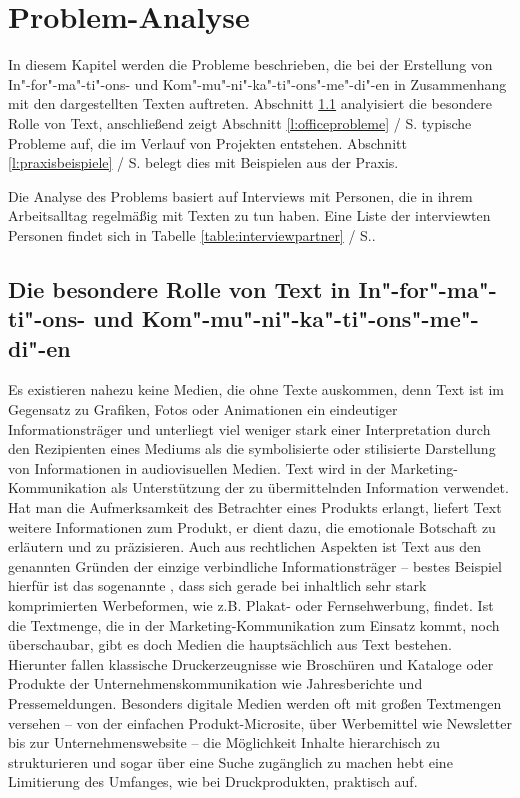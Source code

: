 \section{Problem-Analyse}\label{l:problemanalyse}

In diesem Kapitel werden die Probleme beschrieben, die bei der Erstellung von In"-for"-ma"-ti"-ons- und Kom"-mu"-ni"-ka"-ti"-ons"-me"-di"-en in Zusammenhang mit den dargestellten Texten auftreten. Abschnitt \ref{l:besondererolle} analyisiert die besondere Rolle von Text, anschließend zeigt Abschnitt \ref{l:officeprobleme} / S.\pageref{l:officeprobleme} typische Probleme auf, die im Verlauf von Projekten entstehen. Abschnitt \ref{l:praxisbeispiele} / S.\pageref{l:praxisbeispiele} belegt dies mit Beispielen aus der Praxis. 

\bigskip

Die Analyse des Problems basiert auf Interviews mit Personen, die in ihrem Arbeitsalltag regelmäßig mit Texten zu tun haben. Eine Liste der interviewten Personen findet sich in Tabelle \ref{table:interviewpartner} / S.\pageref{table:interviewpartner}.

\subsection{Die besondere Rolle von Text in In"-for"-ma"-ti"-ons- und Kom"-mu"-ni"-ka"-ti"-ons"-me"-di"-en}\label{l:besondererolle}

Es existieren nahezu keine Medien, die ohne Texte auskommen, denn Text ist im Gegensatz zu Grafiken, Fotos oder Animationen ein eindeutiger Informationsträger und unterliegt viel weniger stark einer Interpretation durch den Rezipienten eines Mediums als die symbolisierte oder stilisierte Darstellung von Informationen in audiovisuellen Medien. Text wird in der Marketing-Kommunikation als Unterstützung der zu übermittelnden Information verwendet. Hat man die Aufmerksamkeit des Betrachter eines Produkts erlangt, liefert Text weitere Informationen zum Produkt, er dient dazu, die emotionale Botschaft zu erläutern und zu präzisieren. Auch aus rechtlichen Aspekten ist Text aus den genannten Gründen der einzige verbindliche Informationsträger -- bestes Beispiel hierfür ist das sogenannte , dass sich gerade bei inhaltlich sehr stark komprimierten Werbeformen, wie z.B. Plakat- oder Fernsehwerbung, findet. Ist die Textmenge, die in der Marketing-Kommunikation zum Einsatz kommt, noch überschaubar, gibt es doch Medien die hauptsächlich aus Text bestehen. Hierunter fallen klassische Druckerzeugnisse wie Broschüren und Kataloge oder Produkte der Unternehmenskommunikation wie Jahresberichte und Pressemeldungen. Besonders digitale Medien werden oft mit großen Textmengen versehen -- von der einfachen Produkt-Microsite, über Werbemittel wie Newsletter bis zur Unternehmenswebsite -- die Möglichkeit Inhalte hierarchisch zu strukturieren und sogar über eine Suche zugänglich zu machen hebt eine Limitierung des Umfanges, wie bei Druckprodukten, praktisch auf.

